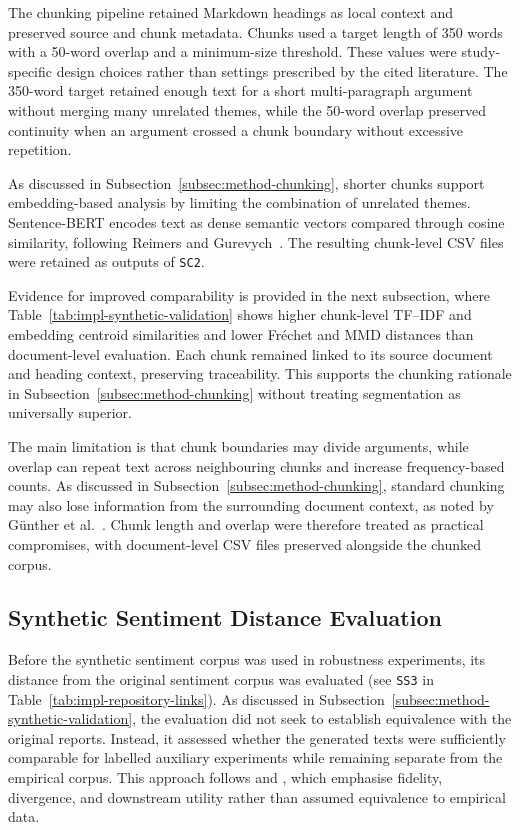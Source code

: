 The chunking pipeline retained Markdown headings as local context and preserved
source and chunk metadata. Chunks used a target length of 350 words with a 50-word
overlap and a minimum-size threshold. These values were study-specific design choices
rather than settings prescribed by the cited literature. The 350-word target retained
enough text for a short multi-paragraph argument without merging many unrelated
themes, while the 50-word overlap preserved continuity when an argument crossed a
chunk boundary without excessive repetition.

As discussed in Subsection~\ref{subsec:method-chunking}, shorter chunks support
embedding-based analysis by limiting the combination of unrelated themes.
Sentence-BERT encodes text as dense semantic vectors compared through cosine
similarity, following Reimers and Gurevych~\cite{reimers2019sentence}. The resulting
chunk-level CSV files were retained as outputs of \texttt{SC2}.

Evidence for improved comparability is provided in the next subsection, where
Table~\ref{tab:impl-synthetic-validation} shows higher chunk-level TF--IDF and
embedding centroid similarities and lower Fr\'echet and MMD distances than
document-level evaluation. Each chunk remained linked to its source document and
heading context, preserving traceability. This supports the chunking rationale in
Subsection~\ref{subsec:method-chunking} without treating segmentation as universally
superior.

The main limitation is that chunk boundaries may divide arguments, while overlap can
repeat text across neighbouring chunks and increase frequency-based counts. As
discussed in Subsection~\ref{subsec:method-chunking}, standard chunking may also lose
information from the surrounding document context, as noted by G{\"u}nther et
al.~\cite{gunther2024latechunking}. Chunk length and overlap were therefore treated
as practical compromises, with document-level CSV files preserved alongside the
chunked corpus.

\subsection{Synthetic Sentiment Distance Evaluation}

Before the synthetic sentiment corpus was used in robustness experiments, its
distance from the original sentiment corpus was evaluated (see \texttt{SS3} in
Table~\ref{tab:impl-repository-links}). As discussed in
Subsection~\ref{subsec:method-synthetic-validation}, the evaluation did not seek to
establish equivalence with the original reports. Instead, it assessed whether the
generated texts were sufficiently comparable for labelled auxiliary experiments
while remaining separate from the empirical corpus. This approach follows
\cite{chim2025evaluating} and \cite{tari2026privacy}, which emphasise fidelity,
divergence, and downstream utility rather than assumed equivalence to empirical data.

